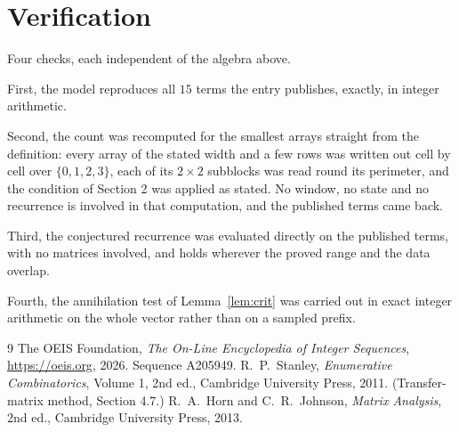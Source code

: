 \documentclass[11pt,a4paper]{article}
\theoremstyle{plain}
\theoremstyle{definition}
\begin{document}
\section{Verification}

Four checks, each independent of the algebra above.

First, the model reproduces all $15$ terms the entry publishes, exactly, in integer
arithmetic.

Second, the count was recomputed for the smallest arrays straight from the definition: every
array of the stated width and a few rows was written out cell by cell over $\{0,1,2,3\}$, each of
its $2\times2$ subblocks was read round its perimeter, and the condition of Section 2 was
applied as stated. No window, no state and no recurrence is involved in that computation, and
the published terms came back.

Third, the conjectured recurrence was evaluated directly on the published terms, with no
matrices involved, and holds wherever the proved range and the data overlap.

Fourth, the annihilation test of Lemma~\ref{lem:crit} was carried out in exact integer
arithmetic on the whole vector rather than on a sampled prefix.

\begin{thebibliography}{9}
 The OEIS Foundation, \emph{The On-Line Encyclopedia of Integer
Sequences}, \url{https://oeis.org}, 2026. Sequence A205949.
 R.~P.~Stanley, \emph{Enumerative Combinatorics}, Volume 1, 2nd ed.,
Cambridge University Press, 2011. (Transfer-matrix method, Section 4.7.)
 R.~A.~Horn and C.~R.~Johnson, \emph{Matrix Analysis}, 2nd ed., Cambridge
University Press, 2013.
\end{thebibliography}
\end{document}
